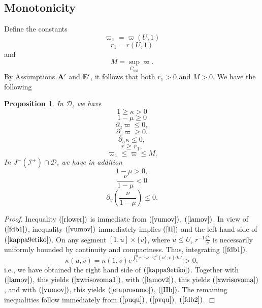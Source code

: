 \documentclass{article}
\newtheorem{proposition}{Proposition}[section]
\begin{document}
\subsection{Monotonicity}
Define the constants
\[
\varpi_1=\varpi(U,1)
\]
\begin{equation}
\label{r_1def}
r_1=r(U,1)
\end{equation}
and 
\begin{equation}
\label{MDEF}
M=\sup_{C_{out}}{\varpi}.
\end{equation}
By Assumptions ${\bf A}'$ and ${\bf E}'$, it follows that both $r_1>0$
and $M>0$.  
We have the following
\begin{proposition}
In $\mathcal{D}$, we have
\begin{equation}
\label{kappa9etiko}
1\ge\kappa>0
\end{equation}
\begin{equation}
\label{xwrisovoma1}
1-\mu\ge0
\end{equation}
\begin{equation}
\label{pumov}
\partial_u\varpi\le0,
\end{equation}
\begin{equation}
\label{pvmov}
\partial_v\varpi\ge0.
\end{equation}
\begin{equation}
\label{II}
\partial_u\kappa\le0,
\end{equation}
\begin{equation}
\label{rlower}
r\ge r_1,
\end{equation}
\begin{equation}
\label{pi-pavwkatw}
\varpi_1\le\varpi\le M.
\end{equation}
In $J^{-}(\mathcal{I}^+)\cap\mathcal{D}$, we have in addition
\begin{equation}
\label{xwrisovoma}
1-\mu>0,
\end{equation}
\begin{equation}
\label{etaprosnmo}
\frac{\nu}{1-\mu}<0
\end{equation}
\begin{equation}
\label{IIb}
\partial_v\left(\frac\nu{1-\mu}\right)\le0.
\end{equation}
\end{proposition}

\noindent\emph{Proof.} 
Inequality $(\ref{rlower})$ is immediate from $(\ref{vumov})$, $(\ref{lamov})$.
In view of $(\ref{fdb1})$, 
inequality $(\ref{vumov})$ immediately implies $(\ref{II})$ and the left hand
side of $(\ref{kappa9etiko})$.
On any segment $[1,u]\times\{v\}$, where $u\le U$,
$r^{-1}\frac{\zeta^2}{\nu}$ is necessarily uniformly bounded by
continuity and compactness.
Thus, integrating $(\ref{fdb1})$,
\[
\kappa(u,v)=\kappa(1,v)
e^{\int_1^u{r^{-1}\nu^{-1}\zeta^2(u',v)du'}}>0,
\]
i.e., we have obtained the right hand side of $(\ref{kappa9etiko})$. 
Together with $(\ref{lamov})$, this yields $(\ref{xwrisovoma1})$,
with $(\ref{lamov2})$, this yields $(\ref{xwrisovoma})$,
and with $(\ref{vumov})$, this yields $(\ref{etaprosnmo})$, $(\ref{IIb})$. 
The remaining inequalities follow immediately from
$(\ref{puqu})$, $(\ref{pvqu})$, $(\ref{fdb2})$. $\Box$
\end{document}
